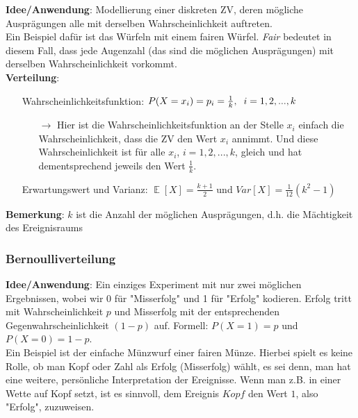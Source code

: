 \documentclass[a4paper]{article}
\DeclareMathOperator*{\E}{\mathbb{E}}
\begin{document}
\noindent \textbf{Idee/Anwendung}: Modellierung einer diskreten ZV, deren mögliche Ausprägungen alle mit derselben Wahrscheinlichkeit auftreten. \\

\noindent Ein Beispiel dafür ist das Würfeln mit einem fairen Würfel. \textit{Fair} bedeutet in diesem Fall, dass jede Augenzahl (das sind die möglichen Ausprägungen) mit derselben Wahrscheinlichkeit vorkommt. \\

\noindent \textbf{Verteilung}: 
\begin{itemize}
\item[] Wahrscheinlichkeitsfunktion: $P(X=x_i)=p_i=\frac{1}{k}, \hspace{0.2cm} i=1,2,...,k$
	\begin{itemize}
	\item[$\rightarrow$] Hier ist die Wahrscheinlichkeitsfunktion an der Stelle $x_i$ einfach die Wahrscheinlichkeit, dass die ZV den Wert $x_i$ annimmt. Und diese Wahrscheinlichkeit ist für alle $x_i$, $i=1,2,...,k$, gleich und hat dementsprechend jeweils den Wert $\frac{1}{k}$.
	\end{itemize}
\item[] Erwartungswert und Varianz: $\E[X]=\frac{k+1}{2}$ und $Var[X]=\frac{1}{12}(k^2-1)$
\end{itemize}
\noindent \textbf{Bemerkung}: $k$ ist die Anzahl der möglichen Ausprägungen, d.h. die Mächtigkeit des Ereignisraums

\subsubsection{Bernoulliverteilung} \label{sec:Ber}

\noindent \textbf{Idee/Anwendung}:  Ein einziges Experiment mit nur zwei möglichen Ergebnissen, wobei wir 0 für "Misserfolg" und 1 für "Erfolg" kodieren. Erfolg tritt mit Wahrscheinlichkeit $p$ und Misserfolg mit der entsprechenden Gegenwahrscheinlichkeit $(1-p)$ auf. Formell: $P(X=1)=p$ und $P(X=0)=1-p$. \\

\noindent Ein Beispiel ist der einfache Münzwurf einer fairen Münze. Hierbei spielt es keine Rolle, ob man Kopf oder Zahl als Erfolg (Misserfolg) wählt, es sei denn, man hat eine weitere, persönliche Interpretation der Ereignisse. Wenn man z.B. in einer Wette auf Kopf setzt, ist es sinnvoll, dem Ereignis $Kopf$ den Wert $1$, also "Erfolg", zuzuweisen. \\
\end{document}
